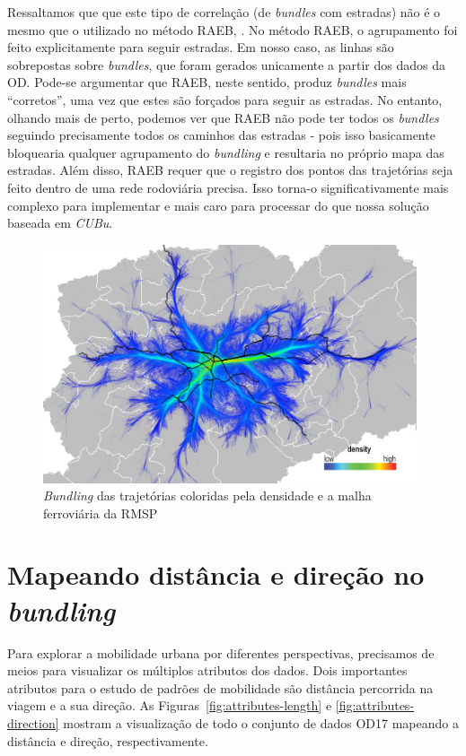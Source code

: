 Ressaltamos que que este tipo de correlação (de \emph{bundles} com estradas) não
é o mesmo que o utilizado no método RAEB, \cite{zeng:19}. No método RAEB, o
agrupamento foi feito explicitamente para seguir estradas. Em nosso caso, as
linhas são sobrepostas sobre \emph{bundles}, que foram gerados unicamente a partir dos
dados da OD. Pode-se argumentar que RAEB, neste sentido, produz \emph{bundles}
mais ``corretos'', uma vez que estes são forçados para seguir as estradas. No
entanto, olhando mais de perto, podemos ver que RAEB não pode ter todos os
\emph{bundles} seguindo precisamente todos os caminhos das estradas - pois isso
basicamente bloquearia qualquer agrupamento do \emph{bundling} e resultaria no próprio
mapa das estradas. Além disso, RAEB requer que o registro dos pontos das trajetórias
seja feito dentro de uma rede rodoviária precisa. Isso torna-o
significativamente mais complexo para implementar e mais caro para processar do
que nossa solução baseada em \emph{CUBu}.

\begin{figure}[!htb]
  \centering
  \captionsetup{justification=centering}
  \includegraphics[width=0.98\textwidth]{../figuras/rail-lines.png}
    \caption{\emph{Bundling} das trajetórias coloridas pela densidade e a malha ferroviária da RMSP}
  \label{fig:rails}  
\end{figure}

\section{Mapeando distância e direção no \emph{bundling}}
\label{sec:length-direction}

Para explorar a mobilidade urbana por diferentes perspectivas, precisamos de
meios para visualizar os múltiplos atributos dos dados. Dois
importantes atributos para o estudo de padrões de mobilidade são distância
percorrida na viagem e a sua direção. As Figuras~\ref{fig:attributes-length} e
\ref{fig:attributes-direction} mostram a visualização de todo o conjunto de
dados OD17 mapeando a distância e direção, respectivamente.

